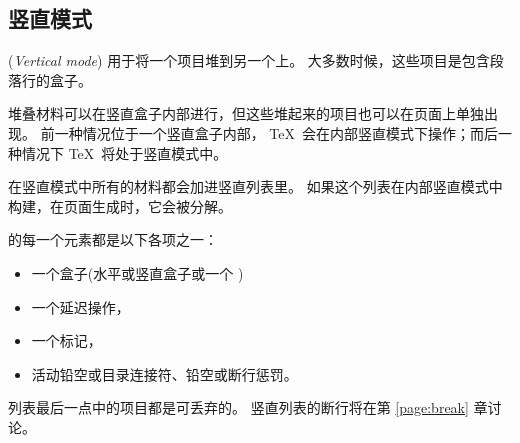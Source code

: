 \documentclass{book}
\begin{document}
\subsection{竖直模式}

(\emph{Vertical mode})
用于将一个项目堆到另一个上。
大多数时候，这些项目是包含段落行的盒子。

堆叠材料可以在竖直盒子内部进行，但这些堆起来的项目也可以在页面上单独出现。
前一种情况位于一个竖直盒子内部，
\TeX\ 会在内部竖直模式下操作；而后一种情况下 \TeX\ 将处于竖直模式中。

在竖直模式中所有的材料都会加进竖直列表里。
如果这个列表在内部竖直模式中构建，在页面生成时，它会被分解。

的每一个元素都是以下各项之一：
\begin{itemize}
  \item 一个盒子(水平或竖直盒子或一个 )
  \item 一个延迟操作，
  \item 一个标记，
  \item 活动铅空或目录连接符、铅空或断行惩罚。
\end{itemize}
列表最后一点中的项目都是可丢弃的。
竖直列表的断行将在第 \ref{page:break} 章讨论。
\end{document}
